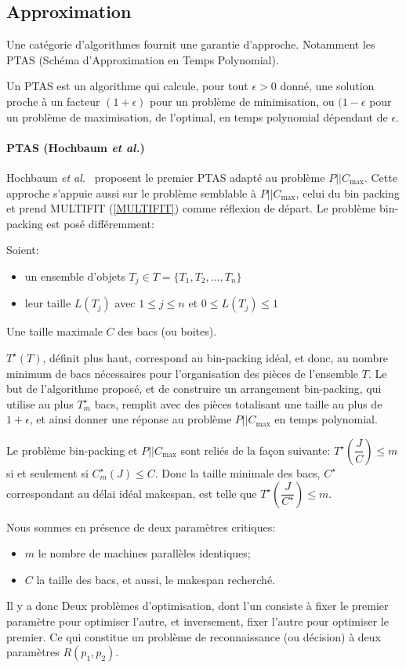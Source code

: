 \documentclass[a4paper,12pt]{report}
\theoremstyle{plain}				%
\theoremstyle{definition}				%
\newcommand\problemGrahamP{$P||C_{\max}$\xspace}
\begin{document}
\subsection{Approximation}

Une catégorie d'algorithmes fournit une garantie d'approche.
Notamment les PTAS (Schéma d'Approximation en Temps Polynomial).

Un PTAS est un algorithme qui calcule, pour tout $\epsilon > 0$ donné,
une solution proche à un facteur $(1+\epsilon)$ pour un problème de
minimisation, ou $(1-\epsilon$ pour un problème de maximisation, de
l'optimal, en temps polynomial dépendant de $\epsilon$.


\paragraph{PTAS (Hochbaum \textit{et al.})}

Hochbaum \textit{et al.}\ \cite{hochbaum1987using} proposent le
premier PTAS adapté au problème \problemGrahamP.
Cette approche s'appuie aussi sur le problème semblable à
\problemGrahamP, celui du bin packing et prend MULTIFIT
(\ref{MULTIFIT}) comme réflexion de départ.
Le problème bin-packing est posé différemment:

Soient:
\begin{itemize}
\item un ensemble d'objets $T_j \in T = \{T_1, T_2, ..., T_n\}$
\item leur taille $L(T_j)$ avec $1 \le j \le n$ et $0 \le L(T_j) \le 1$
\end{itemize}
Une taille maximale $C$ des bacs (ou boites).

$T^{\star}(T)$, définit plus haut, correspond au bin-packing idéal, et donc,
au nombre minimum de bacs nécessaires pour l'organisation des pièces de l'ensemble $T$.
Le but de l'algorithme proposé, et de construire un arrangement bin-packing,
qui utilise au plus $T^{\star}_m$ bacs, remplit
avec des pièces totalisant une taille au plus de $1+ \epsilon$,
et ainsi donner une réponse au problème \problemGrahamP en temps polynomial.

Le problème bin-packing et \problemGrahamP sont reliés de la façon suivante:
$T^{\star}(\dfrac{J}{C}) \le m$ si et seulement si $C^{\star}_m(J) \le C$.
Donc la taille minimale des bacs, $C^{\star}$ correspondant au délai idéal makespan, est telle que $T^{\star}(\dfrac{J}{C^{\star}}) \le m$.

Nous sommes en présence de deux paramètres critiques:
\begin{itemize}
\item $m$ le nombre de machines parallèles identiques;
\item $C$ la taille des bacs, et aussi, le makespan recherché.
\end{itemize}
Il y a donc Deux problèmes d'optimisation,
dont l'un consiste à fixer le premier paramètre pour optimiser l'autre,
et inversement, fixer l'autre pour optimiser le premier.
Ce qui constitue un problème de reconnaissance (ou décision) à deux paramètres $R(p_1, p_2)$.
\end{document}
